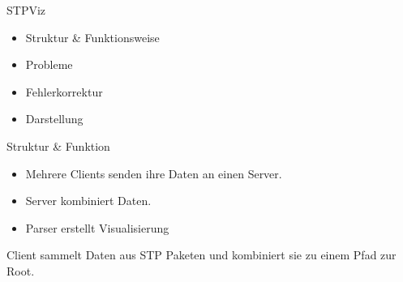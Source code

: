 \documentclass{beamer}
\begin{document}
\begin{frame}{STPViz}
    \begin{itemize}
        \item Struktur \& Funktionsweise
        \item Probleme
        \item Fehlerkorrektur
        \item Darstellung
    \end{itemize}
\end{frame}

\begin{frame}{Struktur \& Funktion}
    \begin{itemize}[<+->]
        \item Mehrere Clients senden ihre Daten an einen Server.
        \item Server kombiniert Daten.
        \item Parser erstellt Visualisierung
    \end{itemize}
    \pause
    Client sammelt Daten aus STP Paketen und kombiniert sie zu einem Pfad zur Root.
\end{frame}
\end{document}
